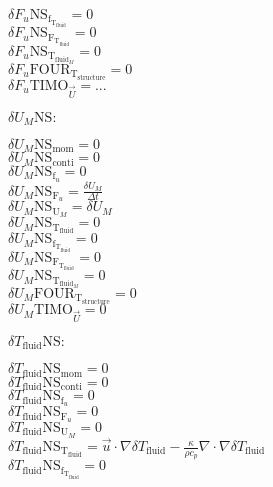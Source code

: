 \documentclass[10pt]{article} %
\begin{document}
\begin{center}
	$\delta F_u \text{NS}_{\text{f}_{\text{T}_{\text{fluid}}}} = 0$\\
	$\delta F_u \text{NS}_{\text{F}_{\text{T}_{\text{fluid}}}} = 0$\\
	$\delta F_u \text{NS}_{\text{T}_{\text{fluid}_M}} = 0$\\
	$\delta F_u \text{FOUR}_{\text{T}_{\text{structure}}} = 0$\\
	$\delta F_u \text{TIMO}_{\vec{U}} = ...$\\
\begin{flushleft}
	$\delta U_M \text{NS}:$
\end{flushleft}
	$\delta U_M \text{NS}_{\text{mom}} =  0$\\
	$\delta U_M \text{NS}_{\text{conti}} = 0$\\
	$\delta U_M \text{NS}_{\text{f}_u} = 0$\\
	$\delta U_M \text{NS}_{\text{F}_u} = \frac{\delta U_M}{\Delta t}$\\
	$\delta U_M \text{NS}_{\text{U}_M} = \delta U_M$\\
	$\delta U_M \text{NS}_{\text{T}_{\text{fluid}}} = 0$\\
	$\delta U_M \text{NS}_{\text{f}_{\text{T}_{\text{fluid}}}} = 0$\\
	$\delta U_M \text{NS}_{\text{F}_{\text{T}_{\text{fluid}}}} = 0$\\
	$\delta U_M \text{NS}_{\text{T}_{\text{fluid}_M}} = 0$\\
	$\delta U_M \text{FOUR}_{\text{T}_{\text{structure}}} = 0$\\
	$\delta U_M \text{TIMO}_{\vec{U}} = 0$\\
\begin{flushleft}
	$\delta T_{\text{fluid}} \text{NS}:$
\end{flushleft}
	$\delta T_{\text{fluid}} \text{NS}_{\text{mom}} =  0$\\
	$\delta T_{\text{fluid}} \text{NS}_{\text{conti}} = 0$\\
	$\delta T_{\text{fluid}} \text{NS}_{\text{f}_u} = 0$\\
	$\delta T_{\text{fluid}} \text{NS}_{\text{F}_u} = 0$\\
	$\delta T_{\text{fluid}} \text{NS}_{\text{U}_M} = 0$\\
	$\delta T_{\text{fluid}} \text{NS}_{\text{T}_{\text{fluid}}} =  \vec{u} \cdot \nabla \delta T_{\text{fluid}} - \frac{\kappa}{\rho c_p} \nabla \cdot \nabla \delta T_{\text{fluid}}$\\
	$\delta T_{\text{fluid}} \text{NS}_{\text{f}_{\text{T}_{\text{fluid}}}} = 0$\\

\end{center}
\end{document}
